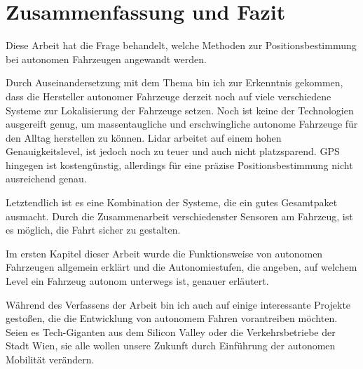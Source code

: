 \chapter{Zusammenfassung und Fazit}

Diese Arbeit hat die Frage behandelt, welche Methoden zur Positionsbestimmung bei autonomen Fahrzeugen angewandt werden.

Durch Auseinandersetzung mit dem Thema bin ich zur Erkenntnis gekommen, dass die Hersteller autonomer Fahrzeuge derzeit noch auf viele verschiedene Systeme zur Lokalisierung der Fahrzeuge setzen. Noch ist keine der Technologien ausgereift genug, um massentaugliche und erschwingliche autonome Fahrzeuge für den Alltag herstellen zu können. \acs{Lidar} arbeitet auf einem hohen Genauigkeitslevel, ist jedoch noch zu teuer und auch nicht platzsparend. \ac{GPS} hingegen ist kostengünstig, allerdings für eine präzise Positionsbestimmung nicht ausreichend genau.

Letztendlich ist es eine Kombination der Systeme, die ein gutes Gesamtpaket ausmacht. Durch die Zusammenarbeit verschiedenster Sensoren am Fahrzeug, ist es möglich, die Fahrt sicher zu gestalten.

Im ersten Kapitel dieser Arbeit wurde die Funktionsweise von autonomen Fahrzeugen allgemein erklärt und die Autonomiestufen, die angeben, auf welchem Level ein Fahrzeug autonom unterwegs ist, genauer erläutert.

Während des Verfassens der Arbeit bin ich auch auf einige interessante Projekte gestoßen, die die Entwicklung von autonomem Fahren vorantreiben möchten. Seien es Tech-Giganten aus dem Silicon Valley oder die Verkehrsbetriebe der Stadt Wien, sie alle wollen unsere Zukunft durch Einführung der autonomen Mobilität verändern.
